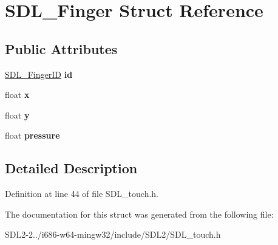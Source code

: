 \hypertarget{structSDL__Finger}{\section{S\+D\+L\+\_\+\+Finger Struct Reference}
\label{structSDL__Finger}
}
\subsection*{Public Attributes}
\begin{DoxyCompactItemize}
\item 
\hypertarget{structSDL__Finger_a3cec630146eeec5bd6299a9387a6f16a}{\hyperlink{structUint64}{S\+D\+L\+\_\+\+Finger\+I\+D} {\bfseries id}}\label{structSDL__Finger_a3cec630146eeec5bd6299a9387a6f16a}

\item 
\hypertarget{structSDL__Finger_ab91dfbd03c3215560457fef44e1c7755}{float {\bfseries x}}\label{structSDL__Finger_ab91dfbd03c3215560457fef44e1c7755}

\item 
\hypertarget{structSDL__Finger_a0a2c7a06ae641940111e03801c672cf9}{float {\bfseries y}}\label{structSDL__Finger_a0a2c7a06ae641940111e03801c672cf9}

\item 
\hypertarget{structSDL__Finger_a0ecb50c7fd699d59899ac60c941bdee6}{float {\bfseries pressure}}\label{structSDL__Finger_a0ecb50c7fd699d59899ac60c941bdee6}

\end{DoxyCompactItemize}


\subsection{Detailed Description}


Definition at line 44 of file S\+D\+L\+\_\+touch.\+h.



The documentation for this struct was generated from the following file\+:\begin{DoxyCompactItemize}
\item 
S\+D\+L2-\/2../i686-\/w64-\/mingw32/include/\+S\+D\+L2/S\+D\+L\+\_\+touch.\+h\end{DoxyCompactItemize}
